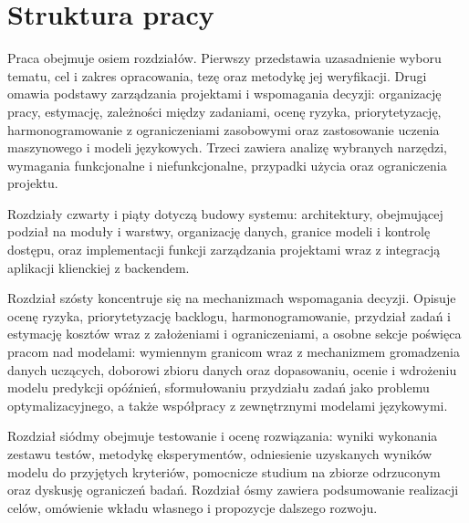 \section{Struktura pracy}

Praca obejmuje osiem rozdziałów. Pierwszy przedstawia uzasadnienie wyboru tematu, cel i zakres opracowania, tezę oraz metodykę jej weryfikacji. Drugi omawia podstawy zarządzania projektami i wspomagania decyzji: organizację pracy, estymację, zależności między zadaniami, ocenę ryzyka, priorytetyzację, harmonogramowanie z ograniczeniami zasobowymi oraz zastosowanie uczenia maszynowego i modeli językowych. Trzeci zawiera analizę wybranych narzędzi, wymagania funkcjonalne i niefunkcjonalne, przypadki użycia oraz ograniczenia projektu.

Rozdziały czwarty i piąty dotyczą budowy systemu: architektury, obejmującej podział na moduły i warstwy, organizację danych, granice modeli i kontrolę dostępu, oraz implementacji funkcji zarządzania projektami wraz z integracją aplikacji klienckiej z backendem.

Rozdział szósty koncentruje się na mechanizmach wspomagania decyzji. Opisuje ocenę ryzyka, priorytetyzację backlogu, harmonogramowanie, przydział zadań i estymację kosztów wraz z założeniami i ograniczeniami, a osobne sekcje poświęca pracom nad modelami: wymiennym granicom wraz z mechanizmem gromadzenia danych uczących, doborowi zbioru danych oraz dopasowaniu, ocenie i wdrożeniu modelu predykcji opóźnień, sformułowaniu przydziału zadań jako problemu optymalizacyjnego, a także współpracy z zewnętrznymi modelami językowymi.

Rozdział siódmy obejmuje testowanie i ocenę rozwiązania: wyniki wykonania zestawu testów, metodykę eksperymentów, odniesienie uzyskanych wyników modelu do przyjętych kryteriów, pomocnicze studium na zbiorze odrzuconym oraz dyskusję ograniczeń badań. Rozdział ósmy zawiera podsumowanie realizacji celów, omówienie wkładu własnego i propozycje dalszego rozwoju.

 